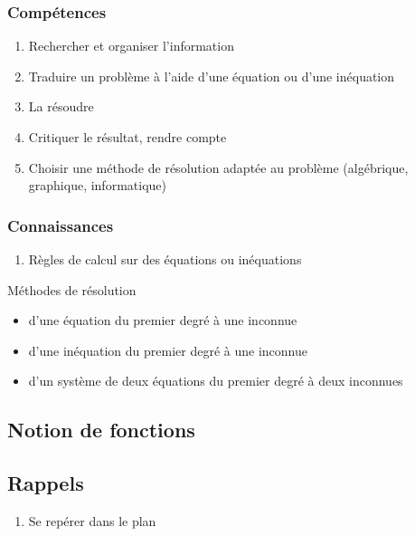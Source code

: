 \documentclass[12pt,a4paper]{article}
\begin{document}
	\subsubsection*{Compétences}
	\begin{enumerate}
		\item Rechercher et organiser l'information
		\item Traduire un problème à l'aide d'une équation ou d'une inéquation
		\item La résoudre
		\item Critiquer le résultat, rendre compte
		\item Choisir une méthode de résolution adaptée au problème (algébrique, graphique, informatique)
	\end{enumerate}
	
	\subsubsection*{Connaissances}
	\begin{enumerate}
		\item Règles de calcul sur des équations ou inéquations
	\end{enumerate}
	Méthodes de résolution
	\begin{itemize}
		\item d'une équation du premier degré à une inconnue
		\item d'une inéquation du premier degré à une inconnue
		\item d'un système de deux équations du premier degré à deux inconnues
	\end{itemize}

\subsection{Notion de fonctions}

	\subsection*{Rappels}
	\begin{enumerate}
		\item Se repérer dans le plan
	\end{enumerate}
\end{document}
